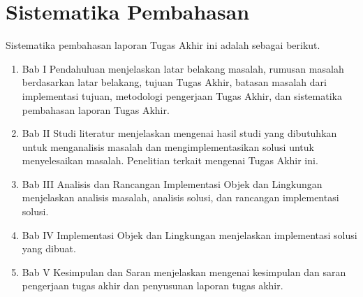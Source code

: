
\section{Sistematika Pembahasan}
Sistematika pembahasan laporan Tugas Akhir ini adalah sebagai berikut.

\begin{enumerate}

	\item Bab I Pendahuluan menjelaskan latar belakang masalah, rumusan masalah
	berdasarkan latar belakang, tujuan Tugas Akhir, batasan masalah dari
	implementasi tujuan, metodologi pengerjaan Tugas Akhir, dan sistematika
	pembahasan laporan Tugas Akhir.

	\item Bab II Studi literatur menjelaskan mengenai hasil studi yang
	dibutuhkan untuk menganalisis masalah dan mengimplementasikan solusi untuk
	menyelesaikan masalah. Penelitian terkait mengenai Tugas Akhir ini.

	\item Bab III Analisis dan Rancangan Implementasi Objek dan Lingkungan
	menjelaskan analisis masalah, analisis solusi, dan rancangan implementasi
	solusi.

	\item Bab IV Implementasi Objek dan Lingkungan menjelaskan implementasi
	solusi yang dibuat.

	\item Bab V Kesimpulan dan Saran menjelaskan mengenai kesimpulan dan saran
	pengerjaan tugas akhir dan penyusunan laporan tugas akhir.

\end{enumerate}
